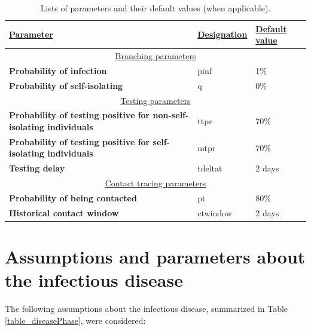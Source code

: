 \documentclass[sr]{drdc-report}
\begin{document}
\begin{table}
\centering
\caption{Lists of parameters and their default values (when applicable).}\label{table_defaultParams}
\begin{tabular}{p{10cm}p{2cm}p{1cm}}
\textbf{\underline{Parameter}} & \textbf{\underline{Designation}} & \textbf{\underline{Default value}}\\
\hline
\multicolumn{3}{c}{ \underline{Branching parameters}} \\
\textbf{Probability of infection} & pinf & 1\%\\
\textbf{Probability of self-isolating} & q & 0\%\\
\hline
\multicolumn{3}{c}{ \underline{Testing parameters}} \\
\textbf{Probability of testing positive for non-self-isolating individuals} & ttpr & 70\%\\
\textbf{Probability of testing positive for self-isolating individuals} & mtpr & 70\%\\
\textbf{Testing delay} & tdeltat & 2 days\\
\hline
\multicolumn{3}{c}{ \underline{Contact tracing parameters}} \\
\textbf{Probability of being contacted} & pt & 80\%\\
\textbf{Historical contact window} & ctwindow & 2 days\\
\hline
\end{tabular}
\end{table}


\section{Assumptions and parameters about the infectious disease}

The following assumptions about the infectious disease, summarized in Table \ref{table_diseasePhase}, were considered:
\end{document}
